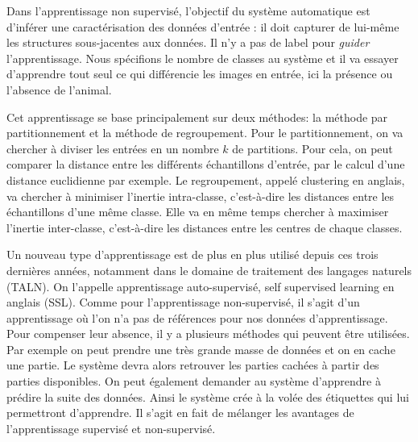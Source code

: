 
Dans l'apprentissage non supervisé, %
l'objectif du système automatique est d'inférer une caractérisation des données d'entrée : il doit capturer de lui-même les structures sous-jacentes aux données. Il n'y a pas de label pour \textit{guider} l'apprentissage. Nous spécifions le nombre de classes au système et il va essayer d'apprendre tout seul ce qui différencie les images en entrée, ici la présence ou l'absence de l'animal.

Cet apprentissage se base principalement sur deux méthodes: la méthode par partitionnement et la méthode de regroupement. Pour le partitionnement, on va chercher à diviser les entrées en un nombre $k$ de partitions. Pour cela, on peut comparer la distance entre les différents échantillons d'entrée, par le calcul d'une distance euclidienne par exemple. Le regroupement, appelé clustering en anglais, va chercher à minimiser l'inertie intra-classe, c'est-à-dire les distances entre les échantillons d'une même classe. Elle va en même temps chercher à maximiser l'inertie inter-classe, c'est-à-dire les distances entre les centres de chaque classes. %

Un nouveau type d'apprentissage est de plus en plus utilisé depuis ces trois dernières années, notamment dans le domaine de traitement des langages naturels (TALN). On l'appelle apprentissage auto-supervisé, self supervised learning en anglais (SSL). Comme pour l'apprentissage non-supervisé, il s'agit d'un apprentissage où l'on n'a pas de références pour nos données d'apprentissage. Pour compenser leur absence, il y a plusieurs méthodes qui peuvent être utilisées. Par exemple on peut prendre une très grande masse de données et on en cache une partie. Le système devra alors retrouver les parties cachées à partir des parties disponibles. On peut également demander au système d'apprendre à prédire la suite des données. Ainsi le système crée à la volée des étiquettes qui lui permettront d'apprendre. Il s'agit en fait de mélanger les avantages de l'apprentissage supervisé et non-supervisé.

